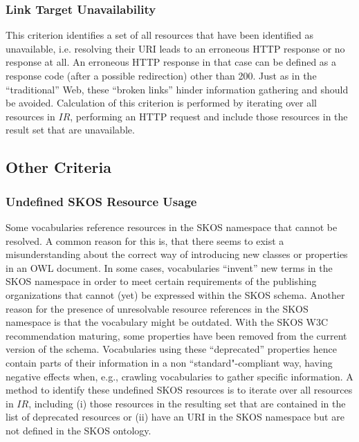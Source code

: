 
\subsubsection{Link Target Unavailability} 
This criterion identifies a set of all resources that have been identified as unavailable, i.e. resolving their URI leads to an erroneous HTTP response or no response at all. An erroneous HTTP response in that case can be defined as a response code (after a possible redirection) other than 200. Just as in the ``traditional'' Web, these ``broken links'' hinder information gathering and should be avoided. Calculation of this criterion is performed by iterating over all resources in $IR$, performing an HTTP request and include those resources in the result set that are unavailable.


\subsection{Other Criteria}

\subsubsection{Undefined SKOS Resource Usage}
Some vocabularies reference resources in the SKOS namespace that cannot be resolved. A common reason for this is, that there seems to exist a misunderstanding about the correct way of introducing new classes or properties in an OWL document. In some cases, vocabularies ``invent'' new terms in the SKOS namespace in order to meet certain requirements of the publishing organizations that cannot (yet) be expressed within the SKOS schema. Another reason for the presence of unresolvable resource references in the SKOS namespace is that the vocabulary might be outdated. With the SKOS W3C recommendation maturing, some properties have been removed from the current version of the schema. Vocabularies using these ``deprecated'' properties hence contain parts of their information in a non ``standard"-compliant way, having negative effects when, e.g., crawling vocabularies to gather specific information. A method to identify these undefined SKOS resources is to iterate over all resources in $IR$, including (i) those resources in the resulting set that are contained in the list of deprecated resources or (ii) have an URI in the SKOS namespace but are not defined in the SKOS ontology. 

